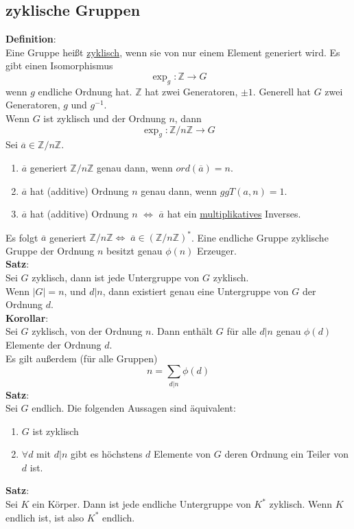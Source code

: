 \documentclass[a4paper, 12pt]{article}
\begin{document}
\subsection{zyklische Gruppen}
\textbf{Definition}:\\
Eine Gruppe heißt \underline{zyklisch}, wenn sie von nur einem Element generiert wird. Es gibt einen Isomorphismus \[\exp_g: \mathbb{Z} \to G\] wenn $g$ endliche Ordnung hat. $\mathbb{Z}$ hat zwei Generatoren, $\pm1$. Generell hat $G$ zwei Generatoren, $g$ und $g^{-1}$.\\
Wenn $G$ ist zyklisch und der Ordnung $n$, dann \[\exp_g: \mathbb{Z}/n\mathbb{Z} \to G\]
Sei $\overline{a} \in \mathbb{Z}/n\mathbb{Z}$. \begin{enumerate}
	\item $\overline{a}$ generiert $\mathbb{Z}/n\mathbb{Z}$ genau dann, wenn $ord(\overline{a}) = n$.
	\item $\overline{a}$ hat (additive) Ordnung $n$ genau dann, wenn $ggT(a,n)=1$.
	\item $\overline{a}$ hat (additive) Ordnung $n$ $\Leftrightarrow$ $\overline{a}$ hat ein \underline{multiplikatives} Inverses. 
\end{enumerate}
Es folgt $\overline{a}$ generiert $\mathbb{Z}/n\mathbb{Z} \Leftrightarrow \; \overline{a} \in (\mathbb{Z}/n\mathbb{Z})^*$. Eine endliche Gruppe zyklische Gruppe der Ordnung $n$ besitzt genau $\phi(n)$ Erzeuger.\\
\textbf{Satz}:\\
Sei $G$ zyklisch, dann ist jede Untergruppe von $G$ zyklisch.\\
Wenn $\left|G\right|=n$, und $d|n$, dann existiert genau eine Untergruppe von $G$ der Ordnung $d$.\\
\textbf{Korollar}:\\
Sei $G$ zyklisch, von der Ordnung $n$. Dann enthält $G$ für alle $d|n$ genau $\phi(d)$ Elemente der Ordnung $d$.\\
Es gilt außerdem (für alle Gruppen) \[n = \sum_{d|n} \phi(d)\]
\textbf{Satz}:\\
Sei $G$ endlich. Die folgenden Aussagen sind äquivalent:\begin{enumerate}
	\item $G$ ist zyklisch
	\item $\forall d$ mit $d|n$ gibt es höchstens $d$ Elemente von $G$ deren Ordnung ein Teiler von $d$ ist. 
\end{enumerate}
\textbf{Satz}:\\
Sei $K$ ein Körper. Dann ist jede endliche Untergruppe von $K^*$ zyklisch. Wenn $K$ endlich ist, ist also $K^*$ endlich.\\
\end{document}
